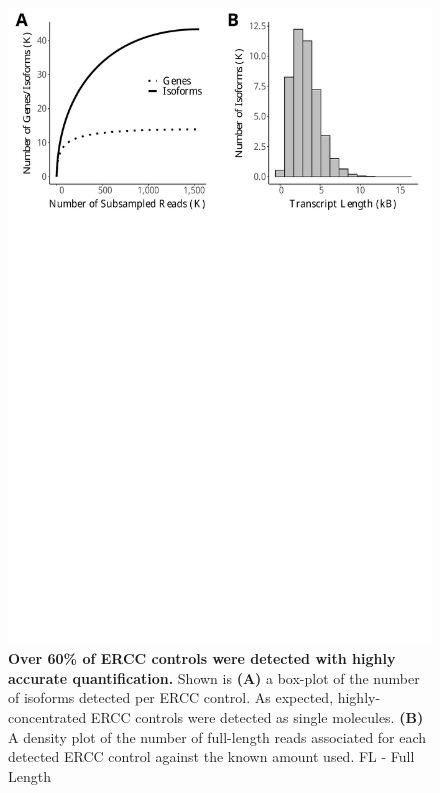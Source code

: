 \begin{figure}[htp]
	\begin{center}
		\includegraphics[page=3,trim={0 25cm 0 0},clip,scale = 0.55]{Figures/IsoSeqWholeTranscriptome.pdf}
	\end{center}
	\captionsetup{width=0.95\textwidth}
	\caption[Detection of ERCC controls from global transcriptome profiling]%
	{\textbf{Over 60\% of ERCC controls were detected with highly accurate quantification.} Shown is \textbf{(A)} a box-plot of the number of isoforms detected per ERCC control. As expected,  highly-concentrated ERCC controls were detected as single molecules. \textbf{(B)} A density plot of the number of full-length reads associated for each detected ERCC control against the known amount used. FL - Full Length}
	\label{fig:isoseq_whole_ercc}
\end{figure}

